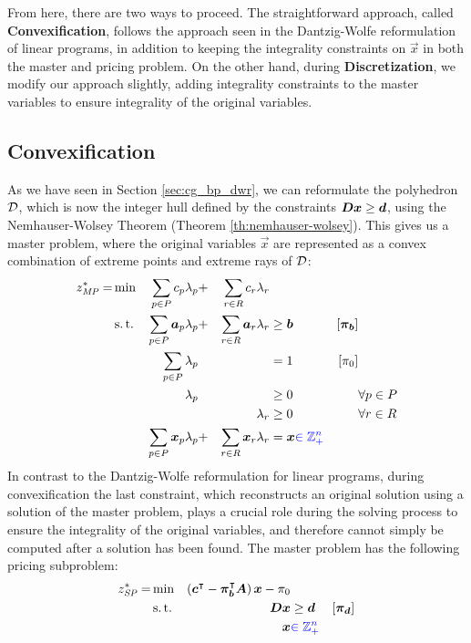 From here, there are two ways to proceed. The straightforward approach, called \textbf{Convexification}, follows the approach seen in the Dantzig-Wolfe reformulation of linear programs, in addition to keeping the integrality constraints on $\vec{x}$ in both the master and pricing problem. On the other hand, during \textbf{Discretization}, we modify our approach slightly, adding integrality constraints to the master variables to ensure integrality of the original variables.

\subsection{Convexification}\label{sec:cg_bp_ip_convexification}
As we have seen in Section \ref{sec:cg_bp_dwr}, we can reformulate the polyhedron $\mathcal{D}$, which is now the integer hull defined by the constraints ${\bm{D}} {\bm{x}} \geq {\bm{d}}$, using the Nemhauser-Wolsey Theorem (Theorem \ref{th:nemhauser-wolsey}). This gives us a master problem, where the original variables $\vec{x}$ are represented as a convex combination of extreme points and extreme rays of $\mathcal{D}$:
\begin{equation}
\begin{aligned}
z^*_{\textit{MP}}{} = &\min & \sum_{p \in P} c_p \lambda_p &+ &\sum_{r \in R} c_r \lambda_r & & & \\
&\operatorname{s.t.} & \sum_{p \in P} {\bm{a}}_p \lambda_p &+ &\sum_{r \in R} {\bm{a}}_r \lambda_r & \geq {\bm{b}} & \left[{\bm{\pi}}_{\bm{b}}\right] \\
&& \sum_{p \in P} \lambda_p & & & = 1 & \left[\pi_0 \right] & \\
&& \lambda_p & & & \geq 0 & & \forall p \in P \\
&& & & \lambda_r & \geq 0 & & \forall r \in R \\
&& \sum_{p \in P} {\bm{x}}_p \lambda_p &+ &\sum_{r \in R} {\bm{x}}_r \lambda_r & = {\bm{x}} {\color{blue} \in \mathbb{Z}_+^n} & &
\end{aligned}
\end{equation}
In contrast to the Dantzig-Wolfe reformulation for linear programs, during convexification the last constraint, which reconstructs an original solution using a solution of the master problem, plays a crucial role during the solving process to ensure the integrality of the original variables, and therefore cannot simply be computed after a solution has been found. The master problem has the following pricing subproblem:
\begin{equation}
\begin{aligned}
z^*_\SP{} = &\min & \left( \vec{c}\transpose - \vec{\pi}_\vec{b}\transpose \mat{A} \right) \vec{x} - \pi_0 & & \\
&\st & \mat{D} \vec{x} & \geq \vec{d} & \left[\vec{\pi}_\vec{d}\right] \\
&& \vec{x} & {\color{blue} \in \mathbb{Z}_+^n}
\end{aligned}
\end{equation}

